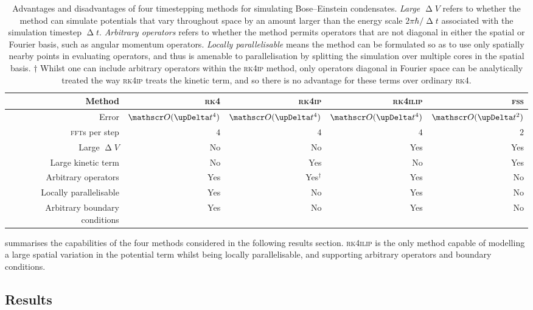 \begin{table}
\centering
\begin{tabular}[c]{|r||rrrr|}
\hline
Method & \textsc{rk4} & \textsc{rk4ip} & \textsc{rk4ilip} & \textsc{fss} \\
\hline
Error & $\Ord{\upDelta t^4}$ & $\Ord{\upDelta t^4}$& $\Ord{\upDelta t^4}$ & $\Ord{\upDelta t^2}$\\
\textsc{fft}s per step & $4$ & $4$ & $4$ & $2$\\
Large $\upDelta V$ & No & No & Yes & Yes\\
Large kinetic term & No & Yes & No & Yes\\
Arbitrary operators & Yes & Yes$^\dagger$ & Yes & No\\
Locally parallelisable & Yes & No & Yes & No\\
Arbitrary boundary conditions & Yes & No & Yes & No\\
\hline
\end{tabular}
\caption{Advantages and disadvantages of four timestepping methods for simulating Bose--Einstein condensates. \emph{Large $\upDelta V$} refers to whether the method can simulate potentials that vary throughout space by an amount larger than the energy scale $2\pi\hbar /{\upDelta t}$ associated with the simulation timestep $\upDelta t$. \emph{Arbitrary operators} refers to whether the method permits operators that are not diagonal in either the spatial or Fourier basis, such as angular momentum operators. \emph{Locally parallelisable} means the method can be formulated so as to use only spatially nearby points in evaluating operators, and thus is amenable to parallelisation by splitting the simulation over multiple cores in the spatial basis.
$\dagger$ Whilst one can include arbitrary operators within the \textsc{rk4ip} method, only operators diagonal in Fourier space can be analytically treated the way \textsc{rk4ip} treats the kinetic term, and so there is no advantage for these terms over ordinary \textsc{rk4}.}\label{table:rk4ilip_methods}
\end{table}

 summarises the capabilities of the four methods considered in the following results section. \textsc{rk4ilip} is the only method capable of modelling a large spatial variation in the potential term whilst being locally parallelisable, and supporting arbitrary operators and boundary conditions.

\subsection{Results}

